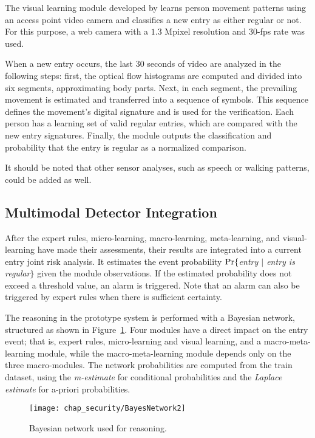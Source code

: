 The visual learning module developed by \cite{pers2007} learns person movement patterns using an access point video camera and classifies a new entry as either regular or not. For this purpose, a web camera with a $1.3$ Mpixel resolution and 30-fps rate was used.

When a new entry occurs, the last 30 seconds of video are analyzed in the following steps: first, the optical flow histograms are computed and divided into six segments, approximating body parts. Next, in each segment, the prevailing movement is estimated and transferred into a sequence of symbols. This sequence defines the movement's digital signature and is used for the verification. Each person has a learning set of valid regular entries, which are compared with the new entry signatures. Finally, the module outputs the classification and probability that the entry is regular as a normalized comparison. 

It should be noted that other sensor analyses, such as speech or walking patterns, could be added as well.

\subsection{Multimodal Detector Integration}
\label{sec:modules:integration} 
	
After the expert rules, micro-learning, macro-learning, meta-learning, and visual-learning have made their assessments, their results are integrated into a current entry joint risk analysis. It estimates the event probability $\text{Pr}\{$\textit{entry $|$ entry is regular}$\}$ given the module observations. If the estimated probability does not exceed a threshold value, an alarm is triggered. Note that an alarm can also be triggered by expert rules when there is sufficient certainty.

The reasoning in the prototype system is performed with a Bayesian network, structured as shown in Figure~\ref{fig:bayesianNetwork}. Four modules have a direct impact on the entry event; that is, expert rules, micro-learning and visual learning, and a macro-meta-learning module, while the macro-meta-learning module depends only on the three macro-modules. The network probabilities are computed from the train dataset, using the \textit{m-estimate} for conditional probabilities and the \textit{Laplace estimate} for a-priori probabilities. 
\begin{figure}[]
\centering
\texttt{[image: chap\_security/BayesNetwork2]}
\caption{Bayesian network used for reasoning.}
\label{fig:bayesianNetwork}
\end{figure}

